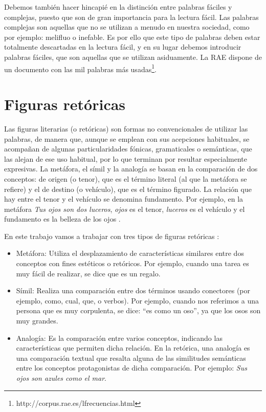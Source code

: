 Debemos también hacer hincapié en la distinción entre palabras fáciles y complejas, puesto que son de gran importancia para la lectura fácil. 
Las palabras complejas son aquellas que no se utilizan a menudo en nuestra sociedad, como por ejemplo: melifluo o inefable. Es por ello que este tipo de palabras deben estar totalmente descartadas en la lectura fácil, y en su lugar debemos introducir palabras fáciles, que son aquellas que se utilizan asiduamente. La RAE dispone de un documento con las mil palabras más usadas\footnote{http://corpus.rae.es/lfrecuencias.html}.




\section{Figuras retóricas}
\label{cap:sec:figurasretoricas}

Las figuras literarias (o retóricas) son formas no convencionales de utilizar las palabras, de manera que, aunque se emplean con sus acepciones habituales, se acompañan de algunas particularidades fónicas, gramaticales o semánticas, que las alejan de ese uso habitual, por lo que terminan por resultar especialmente expresivas. 
La metáfora, el símil y la analogía se basan en la comparación de dos conceptos: de origen (o tenor), que es el término literal (al que la metáfora se refiere) y el de destino (o vehículo), que es el término figurado. La relación que hay entre el tenor y el vehículo se denomina fundamento. Por ejemplo, en la metáfora \textit{Tus ojos son dos luceros}, \textit{ojos} es el tenor, \textit{luceros} es el vehículo y el fundamento es la belleza de los ojos \citep{GalianaYCasas1994}.


En este trabajo vamos a trabajar con tres tipos de figuras retóricas \citep{TFMPaloma2017}: 
\begin{itemize}
	\item Metáfora: Utiliza el desplazamiento de características similares entre dos conceptos con fines estéticos o retóricos. Por ejemplo, cuando una tarea es muy fácil de realizar, se dice que es un regalo.
	
	\item Símil: Realiza una comparación entre dos términos usando conectores (por ejemplo, como, cual, que, o verbos).
	Por ejemplo, cuando nos referimos a una persona que es muy corpulenta, se dice: ``es como un oso'', ya que los osos son muy grandes.
	
	\item Analogía: Es la comparación entre varios conceptos, indicando las características que permiten dicha relación. En la retórica, una analogía es una comparación textual que resalta alguna de las similitudes semánticas entre los conceptos protagonistas de dicha comparación. Por ejemplo: \textit{Sus ojos son azules como el mar}.
	
	
	
\end{itemize}

